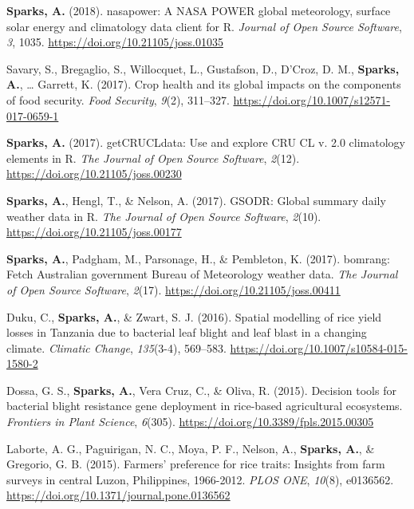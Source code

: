 \documentclass[11pt, a4paper]{awesome-cv}
\begin{document}
\leavevmode\hypertarget{ref-Sparks2018}{}%
\textbf{Sparks, A.} (2018). nasapower: A NASA POWER global meteorology, surface solar energy and climatology data client for R. \emph{Journal of Open Source Software}, \emph{3}, 1035. \url{https://doi.org/10.21105/joss.01035}

\leavevmode\hypertarget{ref-Savary2017}{}%
Savary, S., Bregaglio, S., Willocquet, L., Gustafson, D., D'Croz, D. M., \textbf{Sparks, A.}, \ldots{} Garrett, K. (2017). Crop health and its global impacts on the components of food security. \emph{Food Security}, \emph{9}(2), 311--327. \url{https://doi.org/10.1007/s12571-017-0659-1}

\leavevmode\hypertarget{ref-Sparks2017c}{}%
\textbf{Sparks, A.} (2017). getCRUCLdata: Use and explore CRU CL v. 2.0 climatology elements in R. \emph{The Journal of Open Source Software}, \emph{2}(12). \url{https://doi.org/10.21105/joss.00230}

\leavevmode\hypertarget{ref-Sparks2017}{}%
\textbf{Sparks, A.}, Hengl, T., \& Nelson, A. (2017). GSODR: Global summary daily weather data in R. \emph{The Journal of Open Source Software}, \emph{2}(10). \url{https://doi.org/10.21105/joss.00177}

\leavevmode\hypertarget{ref-Sparks2017a}{}%
\textbf{Sparks, A.}, Padgham, M., Parsonage, H., \& Pembleton, K. (2017). bomrang: Fetch Australian government Bureau of Meteorology weather data. \emph{The Journal of Open Source Software}, \emph{2}(17). \url{https://doi.org/10.21105/joss.00411}

\leavevmode\hypertarget{ref-Duku2016}{}%
Duku, C., \textbf{Sparks, A.}, \& Zwart, S. J. (2016). Spatial modelling of rice yield losses in Tanzania due to bacterial leaf blight and leaf blast in a changing climate. \emph{Climatic Change}, \emph{135}(3-4), 569--583. \url{https://doi.org/10.1007/s10584-015-1580-2}

\leavevmode\hypertarget{ref-Dossa2015}{}%
Dossa, G. S., \textbf{Sparks, A.}, Vera Cruz, C., \& Oliva, R. (2015). Decision tools for bacterial blight resistance gene deployment in rice-based agricultural ecosystems. \emph{Frontiers in Plant Science}, \emph{6}(305). \url{https://doi.org/10.3389/fpls.2015.00305}

\leavevmode\hypertarget{ref-Laborte2015}{}%
Laborte, A. G., Paguirigan, N. C., Moya, P. F., Nelson, A., \textbf{Sparks, A.}, \& Gregorio, G. B. (2015). Farmers' preference for rice traits: Insights from farm surveys in central Luzon, Philippines, 1966-2012. \emph{PLOS ONE}, \emph{10}(8), e0136562. \url{https://doi.org/10.1371/journal.pone.0136562}
\end{document}
